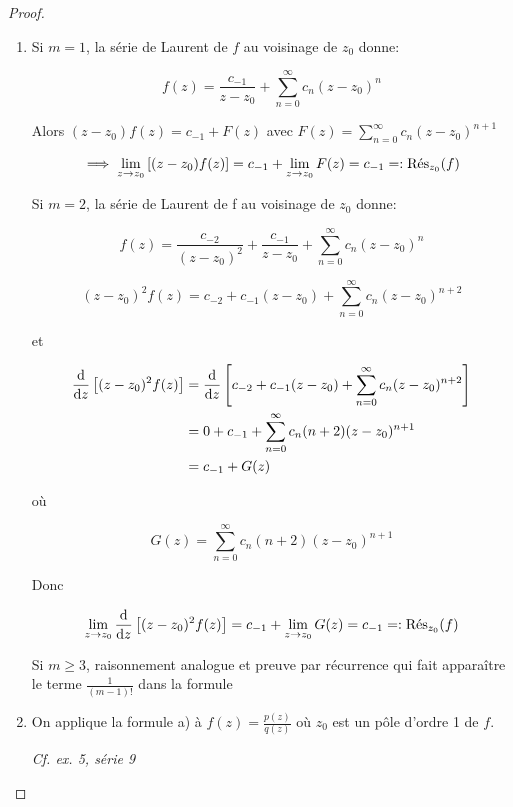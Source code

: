 \begin{proof}
    
    \begin{enumerate}[label=\alph*)]
    \item 
    Si $m = 1$, la série de Laurent de $f$ au voisinage de $z_0$ donne:
    
    \[ f(z) = \frac{c_{-1}}{z - z_0} + \sum_{n = 0}^\infty c_n (z - z_0)^n \]
    
    Alors $(z - z_0) f(z) = c_{-1} + F(z)$ avec $F(z) = \sum\limits_{n = 0}^\infty c_n (z - z_0)^{n + 1}$
    
    \[ \implies \lim_{z \rightarrow z_0} \left[ (z - z_0) f(z) \right] = c_{-1} + \lim_{z \rightarrow z_0} F(z) = c_{-1} =: \Res_{z_0}(f) \]
    
    Si $m = 2$, la série de Laurent de f au voisinage de $z_0$ donne:
    
    \[ f(z) = \frac{c_{-2}}{(z - z_0)^2} + \frac{c_{-1}}{z - z_0} + \sum_{n = 0}^\infty c_n (z - z_0)^n \]
    
    \[ (z - z_0)^2f(z) = c_{-2} + c_{-1}(z - z_0) + \sum_{n = 0}^\infty c_n (z - z_0)^{n + 2} \]
    
    et
    
    \begin{align*}
    \frac{\dd}{\dz}\left[ (z - z_0)^2 f(z) \right]
    &= \frac{\dd}{\dz}\left[ c_{-2} + c_{-1}(z - z_0) + \sum_{n = 0}^\infty c_n (z - z_0)^{n + 2} \right]
    \\&= 0 + c_{-1} + \sum_{n = 0}^\infty c_n (n + 2) (z - z_0)^{n + 1}
    \\&= c_{-1} + G(z)
    \end{align*}
    
    où
    
    \[ G(z) = \sum_{n = 0}^\infty c_n (n + 2) (z - z_0)^{n + 1} \]
    
    \newpage
    
    Donc
    
    \[
    \lim_{z \rightarrow z_0} \frac{\dd}{\dz}\left[ (z - z_0)^2 f(z) \right] = c_{-1} + \lim_{z \rightarrow z_0} G(z) = c_{-1} =: \Res_{z_0}(f)
    \]
    
    Si $m \geq 3$, raisonnement analogue et preuve par récurrence qui fait apparaître le terme $\frac{1}{(m - 1)!}$ dans la formule
    
    \item 
    On applique la formule a) à $f(z) = \frac{p(z)}{q(z)}$ où $z_0$ est un pôle d'ordre 1 de $f$.
    
    \textit{Cf. ex. 5, série 9}
    \end{enumerate}
\end{proof}
